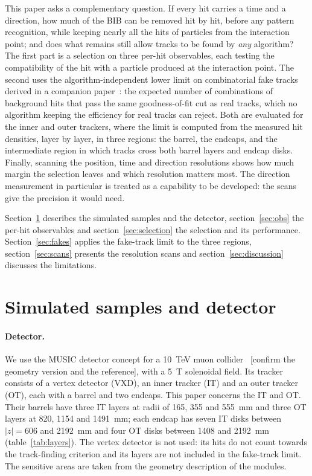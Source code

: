 \IfFileExists{jinst.cls}{\documentclass[a4paper,11pt]{jinst}}
\newcommand{\todo}[1]{\textcolor{red!70!black}{[#1]}}
\begin{document}
This paper asks a complementary question. If every hit carries a time and a direction, how much of
the BIB can be removed hit by hit, before any pattern recognition, while keeping nearly all the hits
of particles from the interaction point; and does what remains still allow tracks to be found by
\emph{any} algorithm? The first part is a selection on three per-hit observables, each testing the
compatibility of the hit with a particle produced at the interaction point. The second uses the
algorithm-independent lower limit on combinatorial fake tracks derived in a companion
paper~\cite{Paper1}: the expected number of combinations of background hits that pass the same
goodness-of-fit cut as real tracks, which no algorithm keeping the efficiency for real tracks can
reject. Both are evaluated for the inner and outer trackers, where the limit is computed from the
measured hit densities, layer by layer, in three regions: the barrel, the endcaps, and the
intermediate region in which tracks cross both barrel layers and endcap disks. Finally, scanning the
position, time and direction resolutions shows how much margin the selection leaves and which
resolution matters most. The direction measurement in particular is treated as a capability to be
developed: the scans give the precision it would need.

Section~\ref{sec:samples} describes the simulated samples and the detector, section~\ref{sec:obs}
the per-hit observables and section~\ref{sec:selection} the selection and its performance.
Section~\ref{sec:fakes} applies the fake-track limit to the three regions, section~\ref{sec:scans}
presents the resolution scans and section~\ref{sec:discussion} discusses the limitations.

\section{Simulated samples and detector}\label{sec:samples}

\paragraph{Detector.} We use the MUSIC detector concept for a 10~TeV muon
collider~\cite{Andreetto:2026music} \todo{confirm the geometry version and the reference}, with a
5~T solenoidal field. Its tracker consists of a vertex detector (VXD), an inner tracker (IT) and
an outer tracker (OT), each with a barrel and two endcaps. This paper concerns the IT and OT. Their
barrels have three IT layers at radii of 165, 355 and 555~mm and three OT layers at 820, 1154 and
1491~mm; each endcap has seven IT disks between $|z|=606$ and 2192~mm and four OT disks between
1408 and 2192~mm (table~\ref{tab:layers}). The vertex detector is not used: its hits do not count
towards the track-finding criterion and its layers are not included in the fake-track limit. The
sensitive areas are taken from the geometry description of the modules.
\end{document}

